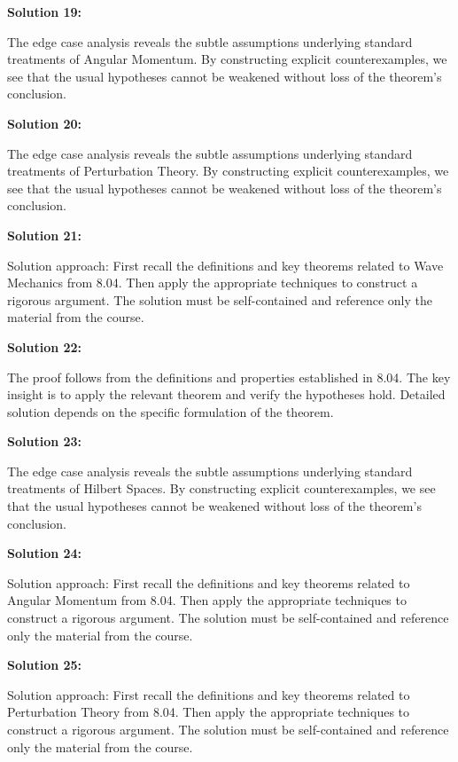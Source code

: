 \documentclass[12pt,a4paper]{exam}
\begin{document}
\vspace{0.5cm}

\textbf{Solution 19:}

The edge case analysis reveals the subtle assumptions underlying standard treatments of Angular Momentum. By constructing explicit counterexamples, we see that the usual hypotheses cannot be weakened without loss of the theorem's conclusion.

\vspace{0.5cm}

\textbf{Solution 20:}

The edge case analysis reveals the subtle assumptions underlying standard treatments of Perturbation Theory. By constructing explicit counterexamples, we see that the usual hypotheses cannot be weakened without loss of the theorem's conclusion.

\vspace{0.5cm}

\textbf{Solution 21:}

Solution approach: First recall the definitions and key theorems related to Wave Mechanics from 8.04. Then apply the appropriate techniques to construct a rigorous argument. The solution must be self-contained and reference only the material from the course.

\vspace{0.5cm}

\textbf{Solution 22:}

The proof follows from the definitions and properties established in 8.04. The key insight is to apply the relevant theorem and verify the hypotheses hold. Detailed solution depends on the specific formulation of the theorem.

\vspace{0.5cm}

\textbf{Solution 23:}

The edge case analysis reveals the subtle assumptions underlying standard treatments of Hilbert Spaces. By constructing explicit counterexamples, we see that the usual hypotheses cannot be weakened without loss of the theorem's conclusion.

\vspace{0.5cm}

\textbf{Solution 24:}

Solution approach: First recall the definitions and key theorems related to Angular Momentum from 8.04. Then apply the appropriate techniques to construct a rigorous argument. The solution must be self-contained and reference only the material from the course.

\vspace{0.5cm}

\textbf{Solution 25:}

Solution approach: First recall the definitions and key theorems related to Perturbation Theory from 8.04. Then apply the appropriate techniques to construct a rigorous argument. The solution must be self-contained and reference only the material from the course.

\vspace{0.5cm}
\end{document}
